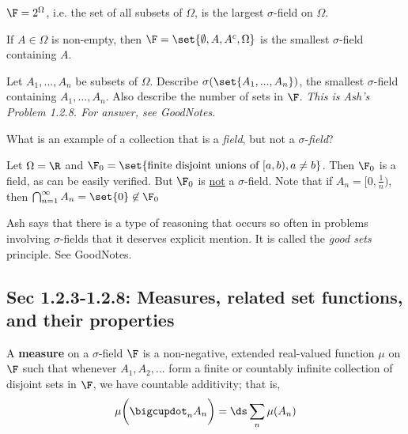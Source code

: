 \documentclass{article} %
\begin{document}
\begin{example}
	$\F =2^\Omega$, i.e. the set of all subsets of $\Omega$, is the largest $\sigma$-field on $\Omega$.
\end{example}

\begin{example}
If $A \in \Omega$ is non-empty, then $\F = \set{\emptyset, A, A^c, \Omega}$ is the smallest $\sigma$-field containing $A$.
\end{example}

\begin{question}
Let $A_1,...,A_n$ be subsets of $\Omega$.  Describe $\sigma(\set{A_1,...,A_n})$, the smallest $\sigma$-field containing $A_1,...,A_n$.  Also describe the number of sets in $\F$.   \textit{This is Ash's Problem 1.2.8.  For answer, see GoodNotes.}	
\end{question}

\begin{example} What is an example of a collection that is a \textit{field}, but not a $\sigma$-\textit{field}?  

Let $\Omega=\R$ and $\F_0 = \set{\text{finite disjoint unions of } [a,b), a \neq b}$.  Then $\F_0$ is a field, as can be easily verified.   But $\F_0$ is \underline{not} a $\sigma$-field.  Note that if $A_n = [0,\frac{1}{n})$, then $\bigcap_{n=1}^\infty A_n = \set{0}  \not\in \F_0$
	
\end{example}

\begin{remark}
Ash says that there is a type of reasoning that occurs so often in problems involving $\sigma$-fields that it deserves explicit mention.  It is called the \textit{good sets} principle.  See GoodNotes. 	
\end{remark}

\subsection{Sec 1.2.3-1.2.8: Measures, related set functions, and their properties}




\begin{definition}
A \textbf{measure} on a $\sigma$-field $\F$ is a non-negative, extended real-valued function $\mu$ on $\F$ such that whenever $A_1, A_2, ...$ form a finite or countably infinite collection of disjoint sets in $\F$, we have countable additivity; that is,
\[ \mu \bigg( \bigcupdot_n A_n \bigg) = \ds\sum_n \mu(A_n) \]
\label{def:measure}	
\end{definition}
\end{document}
